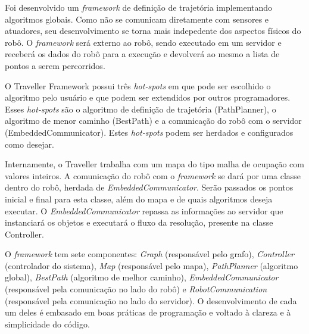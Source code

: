 Foi desenvolvido um \textit{framework} de definição de trajetória implementando algoritmos globais. Como não se comunicam diretamente com sensores e atuadores, seu desenvolvimento se torna mais indepedente dos aspectos físicos do robô. O \textit{framework} será externo ao robô, sendo executado em um servidor e receberá os dados do robô para a execução e devolverá ao mesmo a lista de pontos a serem percorridos.

O Traveller Framework possui três \textit{hot-spots} em que pode ser escolhido o algoritmo pelo usuário e que podem ser extendidos por outros programadores. Esses \textit{hot-spots} são o algoritmo de definição de trajetória (PathPlanner), o algoritmo de menor caminho (BestPath) e a comunicação do robô com o servidor (EmbeddedCommunicator). Estes \textit{hot-spots} podem ser herdados e configurados como desejar.

Internamente, o Traveller trabalha com um mapa do tipo malha de ocupação com valores inteiros. A comunicação do robô com o \textit{framework} se dará por uma classe dentro do robô, herdada de \textit{EmbeddedCommunicator}. Serão passados os pontos inicial e final para esta classe, além do mapa e de quais algoritmos deseja executar. O \textit{EmbeddedCommunicator} repassa as informações ao servidor que instanciará os objetos e executará o fluxo da resolução, presente na classe Controller.

O \textit{framework} tem sete componentes: \textit{Graph} (responsável pelo grafo), \textit{Controller} (controlador do sistema), \textit{Map} (responsável pelo mapa), \textit{PathPlanner} (algoritmo global), \textit{BestPath} (algoritmo de melhor caminho), \textit{EmbeddedCommunicator} (responsável pela comunicação no lado do robô) e \textit{RobotCommunication} (responsável pela comunicação no lado do servidor). O desenvolvimento de cada um deles é embasado em boas práticas de programação e voltado à clareza e à simplicidade do código.